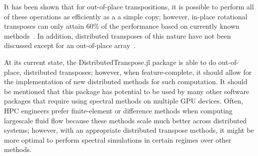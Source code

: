 It has been shown that for out-of-place transpositions, it is possible to perform all of these operations as efficiently as a a simple copy; however, in-place rotational transposes can only attain 60\% of the performance based on currently known methods~\cite{jodra2015}.
In addition, distributed transposes of this nature have not been discussed except for an out-of-place array~\cite{ruetsch2013}.

At its current state, the DistributedTranspose.jl package is able to do out-of-place, distributed transposes; however, when feature-complete, it should allow for the implementation of new distributed methods for such computation.
It should be mentioned that this package has potential to be used by many other software packages that require using spectral methods on multiple GPU devices.
Often, HPC engineers prefer finite-element or difference methods when computing largescale fluid flow because these methods scale much better across distributed systems; however, with an appropriate distributed transpose methods, it might be more optimal to perform spectral simulations in certain regimes over other methods.

